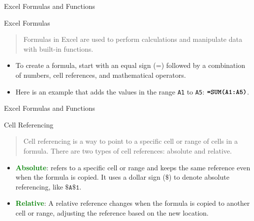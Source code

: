 \documentclass[
  10pt,
  ignorenonframetext,
]{beamer}
\begin{document}
\begin{frame}[fragile]{Excel Formulas and Functions}
\protect\hypertarget{excel-formulas-and-functions-1}{}
\begin{block}{Excel Formulas}
\protect\hypertarget{excel-formulas-1}{}
\vspace{3mm}

\begin{quote}
Formulas in Excel are used to perform calculations and manipulate data
with built-in functions.
\end{quote}

\begin{itemize}
\item
  To create a formula, start with an equal sign (\(\textbf{=}\))
  followed by a combination of numbers, cell references, and
  mathematical operators.
\item
  Here is an example that adds the values in the range \texttt{A1} to
  \texttt{A5}: \(\textbf{\texttt{=SUM(A1:A5)}}\).
\end{itemize}
\end{block}
\end{frame}

\begin{frame}{Excel Formulas and Functions}
\protect\hypertarget{excel-formulas-and-functions-2}{}
\begin{block}{Cell Referencing}
\protect\hypertarget{cell-referencing-1}{}
\begin{quote}
Cell referencing is a way to point to a specific cell or range of cells
in a formula. There are two types of cell references: absolute and
relative.
\end{quote}

\begin{itemize}
\item
  \textcolor{green}{\textbf{Absolute}}: refers to a specific cell or
  range and keeps the same reference even when the formula is copied. It
  uses a dollar sign (\(\texttt{\$}\)) to denote absolute referencing,
  like \(\texttt{\$A\$1}\).
\item
  \textcolor{green}{\textbf{Relative}}: A relative reference changes
  when the formula is copied to another cell or range, adjusting the
  reference based on the new location.
\end{itemize}
\end{block}
\end{frame}
\end{document}
